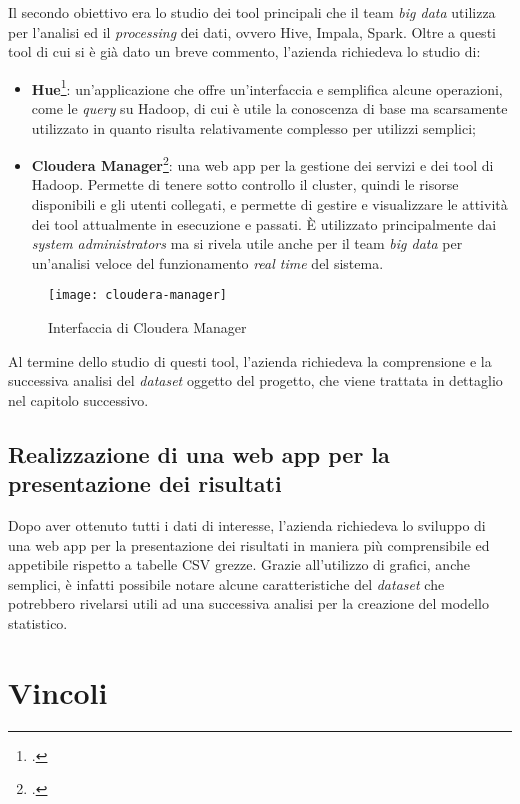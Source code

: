 Il secondo obiettivo era lo studio dei tool principali che il team \textit{big data} utilizza per l'analisi ed il \textit{processing} dei dati, ovvero Hive, Impala, Spark. Oltre a questi tool di cui si è già dato un breve commento, l'azienda richiedeva lo studio di:
\begin{itemize}
	\item \textbf{Hue}\footcite{http://gethue.com/}: un'applicazione che offre un'interfaccia e semplifica alcune operazioni, come le \textit{query} su Hadoop, di cui è utile la conoscenza di base ma scarsamente utilizzato in quanto risulta relativamente complesso per utilizzi semplici;
	\item \textbf{Cloudera Manager}\footcite{https://www.cloudera.com/products/product-components/cloudera-manager.html}: una web app per la gestione dei servizi e dei tool di Hadoop. Permette di tenere sotto controllo il cluster, quindi le risorse disponibili e gli utenti collegati, e permette di gestire e visualizzare le attività dei tool attualmente in esecuzione e passati. È utilizzato principalmente dai \textit{system administrators} ma si rivela utile anche per il team \textit{big data} per un'analisi veloce del funzionamento \textit{real time} del sistema.
\end{itemize} 
\begin{figure}[!h] 
	\centering 
	\texttt{[image: cloudera-manager]}
	\caption{Interfaccia di Cloudera Manager}
\end{figure}
Al termine dello studio di questi tool, l'azienda richiedeva la comprensione e la successiva analisi del \textit{dataset} oggetto del progetto, che viene trattata in dettaglio nel capitolo successivo.
\subsection{Realizzazione di una web app per la presentazione dei risultati}
Dopo aver ottenuto tutti i dati di interesse, l'azienda richiedeva lo sviluppo di una \gls{web app} per la presentazione dei risultati in maniera più comprensibile ed appetibile rispetto a tabelle \gls{CSV} grezze. Grazie all'utilizzo di grafici, anche semplici, è infatti possibile notare alcune caratteristiche del \textit{dataset} che potrebbero rivelarsi utili ad una successiva analisi per la creazione del modello statistico.
\section{Vincoli}
